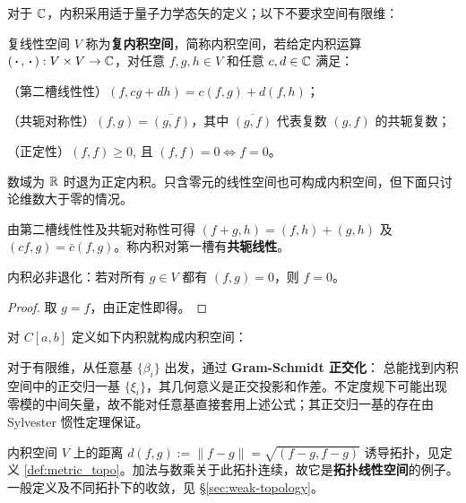 对于 $\mathbb{C}$，内积采用适于量子力学态矢的定义；以下不要求空间有限维：
\begin{definition}\label{def:complex-inner-product}
    复线性空间 $V$ 称为\textbf{复内积空间}，简称内积空间，若给定内积运算 $(\oo, \oo): V \times V \rightarrow \C$，对任意 $f, g, h \in V$ 和任意 $c,d \in \mathbb{C}$ 满足：
    
    （第二槽线性性）$(f, cg+dh)=c(f, g)+d(f, h)$；
    
    （共轭对称性）$(f, g)=\overline{(g, f)}$，其中 $\overline{(g, f)}$ 代表复数 $(g, f)$ 的共轭复数；
    
    （正定性）$(f, f) \geqslant 0$, 且 $(f, f)=0 \Leftrightarrow f=0$。
    \end{definition}
    \begin{remark}
        数域为 $\mathbb{R}$ 时退为正定内积。只含零元的线性空间也可构成内积空间，但下面只讨论维数大于零的情况。
    \end{remark}
    \begin{theorem}
    由第二槽线性性及共轭对称性可得 $(f+g, h)=(f, h)+(g, h)$ 及 $(c f, g)=\bar{c}(f, g)$。称内积对第一槽有\textbf{共轭线性}。
    \end{theorem}
    \begin{theorem}
    内积必非退化：若对所有 $g\in V$ 都有 $(f,g)=0$，则 $f=0$。
    \end{theorem}
\begin{proof}
    取 $g=f$，由正定性即得。
\end{proof}
    \begin{example}
        对 $C[a, b]$ 定义如下内积就构成内积空间：
\end{example}

对于有限维，从任意基 $\{\beta_i\}$ 出发，通过 \textbf{Gram-Schmidt 正交化}：
总能找到内积空间中的正交归一基 $\{\xi_i\}$，其几何意义是正交投影和作差。不定度规下可能出现零模的中间矢量，故不能对任意基直接套用上述公式；其正交归一基的存在由 Sylvester 惯性定理保证。

\begin{example}
    内积空间 $V$ 上的距离 $d(f,g):=\|f-g\|=\sqrt{(f-g,f-g)}$ 诱导拓扑，见定义 \ref{def:metric_topo}。加法与数乘关于此拓扑连续，故它是\textbf{拓扑线性空间}的例子。一般定义及不同拓扑下的收敛，见 \S\ref{sec:weak-topology}。
\end{example}

